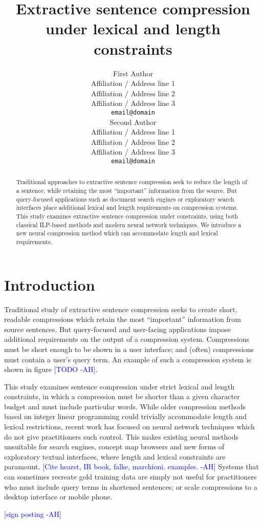 \documentclass[11pt,a4paper]{article}
\title{Extractive sentence compression under lexical and length constraints}
\author{First Author \\
  Affiliation / Address line 1 \\
  Affiliation / Address line 2 \\
  Affiliation / Address line 3 \\
  {\tt email@domain} \\\And
  Second Author \\
  Affiliation / Address line 1 \\
  Affiliation / Address line 2 \\
  Affiliation / Address line 3 \\
  {\tt email@domain} \\}
\date{}
\newcommand{\ahcomment}[1]{\textcolor{blue}{[#1 -AH]}}
\begin{document}
\maketitle

\begin{abstract}
Traditional approaches to extractive sentence compression seek to reduce the length of a sentence, while retaining the most ``important'' information from the source. But query-focused applications such as document search engines or exploratory search interfaces place additional lexical and length requirements on compression systems. This study examines extractive sentence compression under  constraints, using both classical ILP-based methods and modern neural network techniques. We introduce a new neural compression method which can accommodate length and lexical requirements.
\end{abstract}

\section{Introduction}
Traditional study of extractive sentence compression seeks to create short, readable compressions which retain the most ``important'' information from source sentences. But query-focused and user-facing applications impose additional requirements on the output of a compression system. Compressions must be short enough to be shown in a user interface; and (often) compressions must contain a user's query term. An example of such a compression system is shown in figure \ahcomment{TODO}.

This study examines sentence compression under strict lexical and length constraints, in which a compression must be shorter than a given character budget and must include particular words. While older compression methods based on integer linear programming could trivially accommodate length and lexical restrictions, recent work has focused on neural network techniques which do not give practitioners such control. This makes existing neural methods unsuitable for search engines, concept map browsers and new forms of exploratory textual interfaces, where length and lexical constraints are paramount. \ahcomment{Cite hearst, IR book, falke, marchioni. examples.} Systems that can sometimes recreate gold training data are simply not useful for practitioners who must include query terms in shortened sentences; or scale compressions to a desktop interface or mobile phone.

\ahcomment{sign posting}
\end{document}
